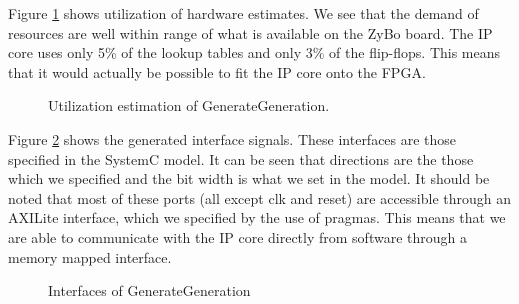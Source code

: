 Figure \ref{fig:ggutilizationestimates} shows utilization of hardware estimates. We see that the demand of resources are well within range of what is available on the ZyBo board. The IP core uses only 5\% of the lookup tables and only 3\% of the flip-flops. This means that it would actually be possible to fit the IP core onto the FPGA.
\FloatBarrier

\begin{figure}[h!]
	\centering
	\caption{Utilization estimation of GenerateGeneration.}
	\label{fig:ggutilizationestimates}
\end{figure}
\FloatBarrier

Figure \ref{fig:gginterface} shows the generated interface signals. These interfaces are those specified in the SystemC model. It can be seen that directions are the those which we specified and the bit width is what we set in the model. It should be noted that most of these ports (all except clk and reset) are accessible through an AXILite interface, which we specified by the use of pragmas. This means that we are able to communicate with the IP core directly from software through a memory mapped interface.

\begin{figure}[h!]
	\centering
	\caption{Interfaces of GenerateGeneration}
	\label{fig:gginterface}
\end{figure}

